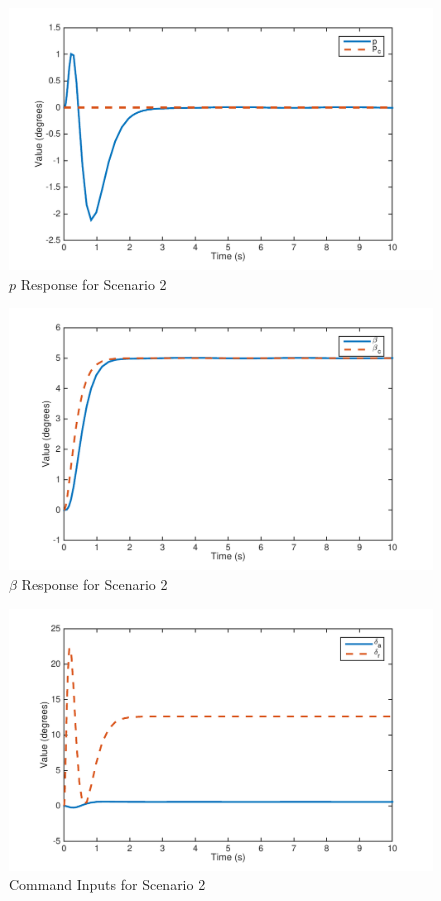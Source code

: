 \documentclass[11pt]{article}
\begin{document}
\begin{figure}[h!]
\begin{center}
\includegraphics[height=.425\textheight]{figures/p1}
\caption{$p$ Response for Scenario 2}
\end{center}
\end{figure}

\begin{figure}[h!]
\begin{center}
\includegraphics[height=.425\textheight]{figures/beta1}
\caption{$\beta$ Response for Scenario 2}
\end{center}
\end{figure}

\begin{figure}[h!]
\begin{center}
\includegraphics[height=.425\textheight]{figures/inputs1}
\caption{Command Inputs for Scenario 2}
\end{center}
\end{figure}
\end{document}
